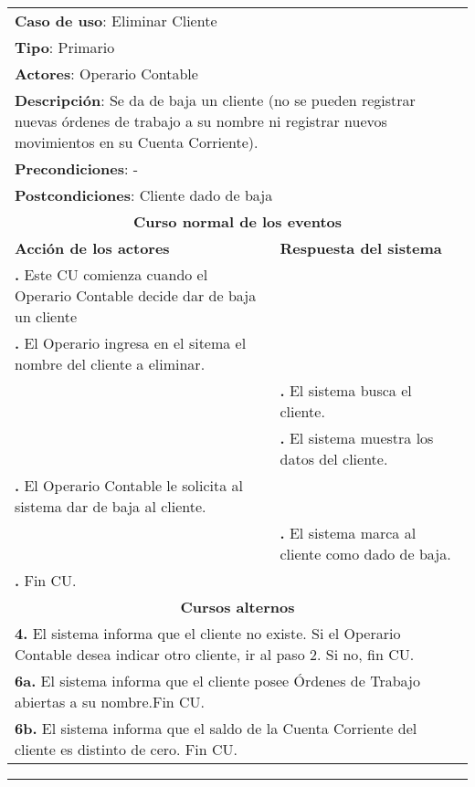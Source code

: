 \documentclass[12pt]{extarticle}
\begin{document}
    \newcommand\inc{\stepcounter{step}\textbf{\thestep. }}


	\begin{longtable}{ |p{8cm}|p{8cm}| }
		\hline
		\multicolumn{2}{|p{16cm}|}{\textbf{Caso de uso}: Eliminar Cliente}\\
		\multicolumn{2}{|p{16cm}|}{\textbf{Tipo}: Primario}\\
		\multicolumn{2}{|p{16cm}|}{\textbf{Actores}: Operario Contable}\\
        \multicolumn{2}{|p{16cm}|}{\textbf{Descripción}: Se da de baja un cliente (no se pueden registrar nuevas órdenes de trabajo a su nombre ni registrar nuevos movimientos en su Cuenta Corriente).}\\
		\multicolumn{2}{|p{16cm}|}{\textbf{Precondiciones}: -}\\
		\multicolumn{2}{|p{16cm}|}{\textbf{Postcondiciones}: Cliente dado de baja}\\
		\hline
		\multicolumn{2}{|c|}{\textbf{Curso normal de los eventos}}\\
		\hline
		\textbf{Acción de los actores} & \textbf{Respuesta del sistema}\\
		\hline
			\inc Este CU comienza cuando el Operario Contable decide dar de baja un cliente & \\
			\hline
			\inc El Operario ingresa en el sitema el nombre del cliente a eliminar.&\\
			\hline
			& \inc El sistema busca el cliente. \\
			\hline
			& \inc El sistema muestra los datos del cliente. \\
			\hline
			\inc  El Operario Contable le solicita al sistema dar de baja al cliente.& \\
			\hline
			& \inc El sistema marca al cliente como dado de baja. \\
			\hline
			\inc Fin CU. & \\
		\hline
		\multicolumn{2}{|c|}{\textbf{Cursos alternos}}\\
		\hline
		\multicolumn{2}{|p{16cm}|}{\textbf{4. }El sistema informa que el cliente no existe. Si el Operario Contable desea indicar otro cliente, ir al paso 2. Si no, fin CU.}\\
		\hline
		\multicolumn{2}{|p{16cm}|}{\textbf{6a. }El sistema informa que el cliente posee Órdenes de Trabajo abiertas a su nombre.Fin CU.}\\
		\hline
        \multicolumn{2}{|p{16cm}|}{\textbf{6b. }El sistema informa que el saldo de la Cuenta Corriente del cliente es distinto de cero. Fin CU.}\\
		\hline	
	\end{longtable}


    \setcounter{step}{0}

    \noindent\rule{169mm}{0.8mm}\\
\end{document}
